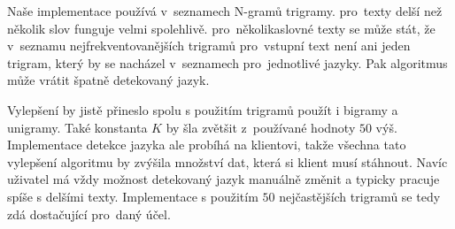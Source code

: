 Naše implementace používá v~seznamech N-gramů trigramy. pro~texty delší než několik slov funguje velmi spolehlivě. pro~několikaslovné texty se může stát, že v~seznamu nejfrekventovanějších trigramů pro~vstupní text není ani jeden trigram, který by se nacházel v~seznamech pro~jednotlivé jazyky. Pak algoritmus může vrátit špatně detekovaný jazyk.

Vylepšení by jistě přineslo spolu s použitím trigramů použít i bigramy a unigramy. Také konstanta $K$ by šla zvětšit z~používané hodnoty $50$ výš. Implementace detekce jazyka ale probíhá na klientovi, takže všechna tato vylepšení algoritmu by zvýšila množství dat, která si klient musí stáhnout. Navíc uživatel má vždy možnost detekovaný jazyk manuálně změnit a typicky pracuje spíše s delšími texty. Implementace s použitím $50$ nejčastějších trigramů se tedy zdá dostačující pro~daný účel.